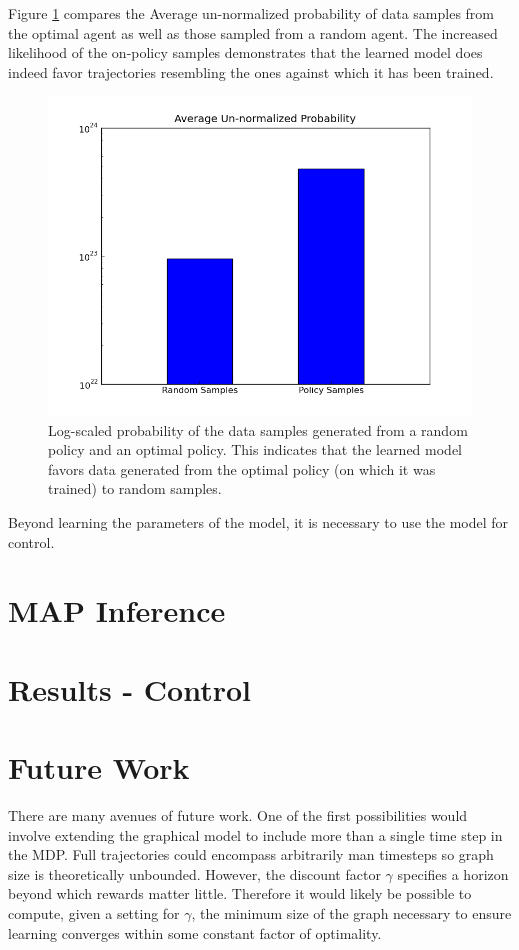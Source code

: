 \documentclass{article} %
\begin{document}
Figure \ref{fig:learning} compares the Average un-normalized probability of data samples from the optimal agent as well as those sampled from a random agent. The increased likelihood of the on-policy samples demonstrates that the learned model does indeed favor trajectories resembling the ones against which it has been trained.

\begin{figure}[htp]
  \centering
  \includegraphics[width=.8\textwidth]{figures/graph.png}
  \caption{Log-scaled probability of the data samples generated from a random policy and an optimal policy. This indicates that the learned model favors data generated from the optimal policy (on which it was trained) to random samples.}
  \label{fig:learning}
\end{figure}

Beyond learning the parameters of the model, it is necessary to use the model for control.

\section{MAP Inference}



\section{Results - Control}

\section{Future Work}
There are many avenues of future work. One of the first possibilities would involve extending the graphical model to include more than a single time step in the MDP. Full trajectories could encompass arbitrarily man timesteps so graph size is theoretically unbounded. However, the discount factor $\gamma$ specifies a horizon beyond which rewards matter little. Therefore it would likely be possible to compute, given a setting for $\gamma$, the minimum size of the graph necessary to ensure learning converges within some constant factor of optimality. 
\end{document}
